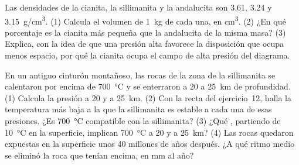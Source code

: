\begin{exercise}[$\star\star\star$]\label{exo:g12:metamorphic-rocks:14}
Las densidades de la cianita, la sillimanita y la andalucita son \num{3.61},
\num{3.24} y \qty{3.15}{g/cm^3}. (1) Calcula el volumen de \qty{1}{kg} de
cada una, en \unit{cm^3}. (2) ¿En qué porcentaje es la cianita más pequeña que
la andalucita de la misma masa? (3) Explica, con la idea de que una presión
alta favorece la disposición que ocupa menos espacio, por qué la cianita ocupa
el campo de alta presión del diagrama.
\end{exercise}

\begin{exercise}[$\star\star\star$]\label{exo:g12:metamorphic-rocks:15}
En un antiguo cinturón montañoso, las rocas de la zona de la sillimanita se
calentaron por encima de \qty{700}{\celsius} y se enterraron a 20 a
\qty{25}{km} de profundidad. (1) Calcula la presión a 20 y a \qty{25}{km}.
(2) Con la recta del ejercicio~12, halla la temperatura más baja a la que la
sillimanita es estable a cada una de esas presiones. ¿Es \qty{700}{\celsius}
compatible con la sillimanita? (3) ¿Qué , partiendo de
\qty{10}{\celsius} en la superficie, implican \qty{700}{\celsius} a 20 y a
\qty{25}{km}? (4) Las rocas quedaron expuestas en la superficie unos 40
millones de años después. ¿A qué ritmo medio se eliminó la roca que tenían
encima, en \unit{mm} al año?
\end{exercise}

